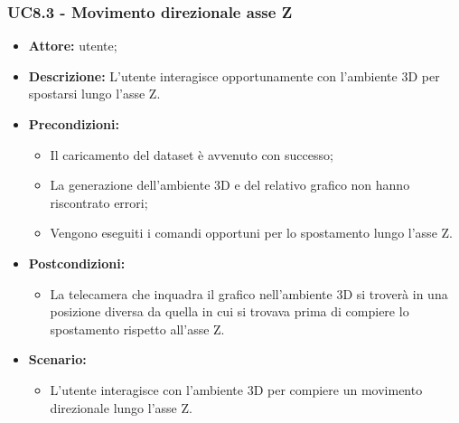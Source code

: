 \subsubsection{UC8.3 - Movimento direzionale asse Z}
\begin{itemize}    
    \item \textbf{Attore:} utente;
    \item \textbf{Descrizione:} L'utente interagisce opportunamente con l'ambiente 3D per spostarsi lungo l'asse Z.
    \item \textbf{Precondizioni:}    
        \begin{itemize}
            \item Il caricamento del dataset è avvenuto con successo;
            \item La generazione dell'ambiente 3D e del relativo grafico non hanno riscontrato errori;
            \item Vengono eseguiti i comandi opportuni per lo spostamento lungo l'asse Z.
        \end{itemize}    
    \item \textbf{Postcondizioni:}
        \begin{itemize}
            \item La telecamera che inquadra il grafico nell'ambiente 3D si troverà in una posizione diversa da quella in cui si trovava prima di compiere lo spostamento rispetto all'asse Z.
        \end{itemize}    
    \item \textbf{Scenario:} 
        \begin{itemize}
            \item L'utente interagisce con l'ambiente 3D per compiere un movimento direzionale lungo l'asse Z.
        \end{itemize}
\end{itemize}

